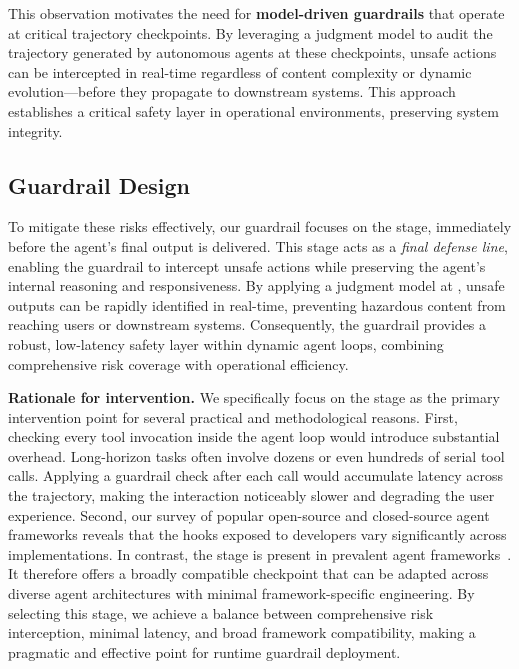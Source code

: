 This observation motivates the need for \textbf{model-driven guardrails} that operate at critical trajectory checkpoints. By leveraging a judgment model to audit the trajectory generated by autonomous agents at these checkpoints, unsafe actions can be intercepted in real-time regardless of content complexity or dynamic evolution—before they propagate to downstream systems. This approach establishes a critical safety layer in operational environments, preserving system integrity.

\subsection{Guardrail Design}
\label{sec:online_guardrail_design}

To mitigate these risks effectively, our guardrail focuses on the \prereply{} stage, immediately before the agent's final output is delivered. This stage acts as a \emph{final defense line}, enabling the guardrail to intercept unsafe actions while preserving the agent's internal reasoning and responsiveness. By applying a judgment model at \prereply{}, unsafe outputs can be rapidly identified in real-time, preventing hazardous content from reaching users or downstream systems. Consequently, the \prereply{} guardrail provides a robust, low-latency safety layer within dynamic agent loops, combining comprehensive risk coverage with operational efficiency.

\textbf{Rationale for \prereply{} intervention.} We specifically focus on the \prereply{} stage as the primary intervention point for several practical and methodological reasons. First, checking every tool invocation inside the agent loop would introduce substantial overhead. Long-horizon tasks often involve dozens or even hundreds of serial tool calls. Applying a guardrail check after each call would accumulate latency across the trajectory, making the interaction noticeably slower and degrading the user experience.
Second, our survey of popular open-source and closed-source agent frameworks reveals that the hooks exposed to developers vary significantly across implementations. In contrast, the \prereply{} stage is present in prevalent agent frameworks~\citep{openai2026codexhooks,nousresearch2026hermeshooks,openclaw2026pluginhooks}. It therefore offers a broadly compatible checkpoint that can be adapted across diverse agent architectures with minimal framework-specific engineering. By selecting this stage, we achieve a balance between comprehensive risk interception, minimal latency, and broad framework compatibility, making \prereply{} a pragmatic and effective point for runtime guardrail deployment.


